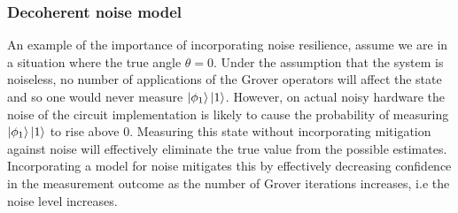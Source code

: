 
\subsubsection{Decoherent noise model}\label{sec::noise}

 An example of the importance of incorporating noise resilience, assume we are in a situation where the true angle $\theta = 0$. Under the assumption that the system is noiseless, no number of applications of the Grover operators will affect the state and so one would never measure $\ket{\phi_1} \ket{1}$. However, on actual noisy hardware the noise of the circuit implementation is likely to cause the probability of measuring $\ket{\phi_1} \ket{1}$ to rise above $0$. Measuring this state without incorporating mitigation against noise will effectively eliminate the true value from the possible estimates. Incorporating a model for noise mitigates this by effectively decreasing confidence in the measurement outcome as the number of Grover iterations increases, i.e the noise level increases.

